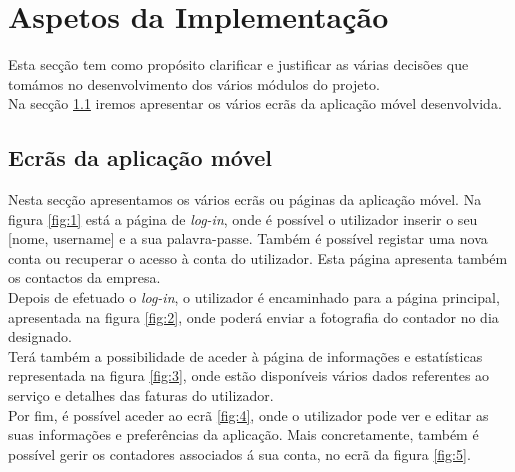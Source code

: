 \chapter{Aspetos da Implementação} \label{cap:implementacao}
Esta secção tem como propósito clarificar e justificar as várias decisões que tomámos no desenvolvimento dos vários módulos do projeto. \\
Na secção \ref{sec:ecra} iremos apresentar os vários ecrãs da aplicação móvel desenvolvida.

\section{Ecrãs da aplicação móvel} \label{sec:ecra}
Nesta secção apresentamos os vários ecrãs ou páginas da aplicação móvel. Na figura \ref{fig:1} está a página de \textit{log-in}, onde é possível o utilizador inserir o seu [nome, username] e a sua palavra-passe. Também é possível registar uma nova conta ou recuperar o acesso à conta do utilizador. Esta página apresenta também os contactos da empresa.\\
Depois de efetuado o \textit{log-in}, o utilizador é encaminhado para a página principal, apresentada na figura \ref{fig:2}, onde poderá enviar a fotografia do contador no dia designado. \\
Terá também a possibilidade de aceder à página de informações e estatísticas representada na figura \ref{fig:3}, onde estão disponíveis vários dados referentes ao serviço e detalhes das faturas do utilizador.\\ Por fim, é possível aceder ao ecrã \ref{fig:4}, onde o utilizador pode ver e editar as suas informações e preferências da aplicação. Mais concretamente, também é possível gerir os contadores associados á sua conta, no ecrã da figura \ref{fig:5}.

